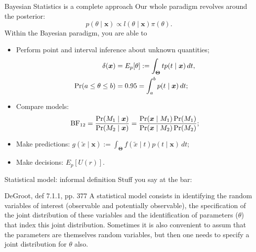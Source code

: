 \begin{frame}{Bayesian Statistics is a complete approach}
Our whole paradigm revolves around the posterior:
$$ p(\theta \mid \boldsymbol{x}) \propto l(\theta \mid \boldsymbol{x})\pi(\theta).$$
Within the Bayesian paradigm, you are able to
\begin{itemize}
 \item Perform point and interval inference about unknown quantities;
 \begin{align*}
  \delta(\boldsymbol{x}) &= E_p[\theta] := \int_{\boldsymbol{\Theta}} t p(t \mid \boldsymbol{x} )\,dt,\\
\operatorname{Pr}( a \leq \theta \leq b) &= 0.95 = \int_{a}^{b} p(t \mid \boldsymbol{x} )\,dt;
 \end{align*}
\item Compare models:
$$\operatorname{BF}_{12} = \frac{\operatorname{Pr}(M_1 \mid \boldsymbol{x})}{\operatorname{Pr}(M_2 \mid \boldsymbol{x})} = \frac{\operatorname{Pr}(\boldsymbol{x} \mid M_1)\operatorname{Pr}(M_1)}{\operatorname{Pr}(\boldsymbol{x} \mid M_2)\operatorname{Pr}(M_2)};$$
 \item Make predictions: $g(\tilde{x} \mid \boldsymbol{x}) := \int_{\boldsymbol{\Theta}} f(\tilde{x} \mid t)p(t\mid \boldsymbol{x})\,dt$;
 \item Make decisions: $E_p[U(r)]$.
\end{itemize} 
\end{frame}
\begin{frame}{Statistical model: informal definition}
Stuff you say at the bar:
\begin{defn}
\label{def:statistical_model_informal}
DeGroot, def 7.1.1, pp. 377
A statistical model consists in identifying the random variables of interest (observable and potentially observable), the specification of the joint distribution of these variables and the identification of parameters ($\theta$) that index this joint distribution.
Sometimes it is also convenient to assum that the parameters are themselves random variables, but then one needs to specify a joint distribution for $\theta$ also.
\end{defn} 
\end{frame}
